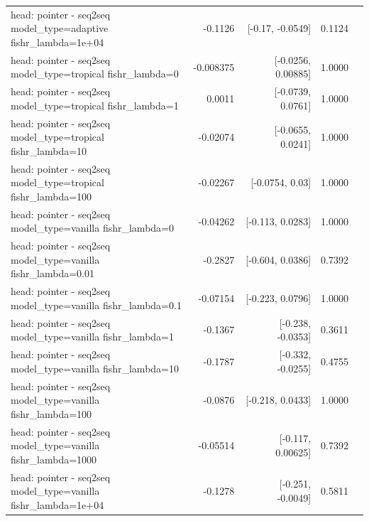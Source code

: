 \documentclass[10pt]{article}
\makeatletter
\newcommand{\stackcell}[1]{\begin{tabular}[t]{@{}l@{}}#1\end{tabular}}
\makeatother
\begin{document}
{\begin{longtable}{lrrrl}
\stackcell{head: pointer - seq2seq\\\footnotesize model\_type=adaptive fishr\_lambda=1e+04 } & -0.1126 & [-0.17, -0.0549] & 0.1124 & \\
\stackcell{head: pointer - seq2seq\\\footnotesize model\_type=tropical fishr\_lambda=0 } & -0.008375 & [-0.0256, 0.00885] & 1.0000 & \\
\stackcell{head: pointer - seq2seq\\\footnotesize model\_type=tropical fishr\_lambda=1 } & 0.0011 & [-0.0739, 0.0761] & 1.0000 & \\
\stackcell{head: pointer - seq2seq\\\footnotesize model\_type=tropical fishr\_lambda=10 } & -0.02074 & [-0.0655, 0.0241] & 1.0000 & \\
\stackcell{head: pointer - seq2seq\\\footnotesize model\_type=tropical fishr\_lambda=100 } & -0.02267 & [-0.0754, 0.03] & 1.0000 & \\
\stackcell{head: pointer - seq2seq\\\footnotesize model\_type=vanilla fishr\_lambda=0 } & -0.04262 & [-0.113, 0.0283] & 1.0000 & \\
\stackcell{head: pointer - seq2seq\\\footnotesize model\_type=vanilla fishr\_lambda=0.01 } & -0.2827 & [-0.604, 0.0386] & 0.7392 & \\
\stackcell{head: pointer - seq2seq\\\footnotesize model\_type=vanilla fishr\_lambda=0.1 } & -0.07154 & [-0.223, 0.0796] & 1.0000 & \\
\stackcell{head: pointer - seq2seq\\\footnotesize model\_type=vanilla fishr\_lambda=1 } & -0.1367 & [-0.238, -0.0353] & 0.3611 & \\
\stackcell{head: pointer - seq2seq\\\footnotesize model\_type=vanilla fishr\_lambda=10 } & -0.1787 & [-0.332, -0.0255] & 0.4755 & \\
\stackcell{head: pointer - seq2seq\\\footnotesize model\_type=vanilla fishr\_lambda=100 } & -0.0876 & [-0.218, 0.0433] & 1.0000 & \\
\stackcell{head: pointer - seq2seq\\\footnotesize model\_type=vanilla fishr\_lambda=1000 } & -0.05514 & [-0.117, 0.00625] & 0.7392 & \\
\stackcell{head: pointer - seq2seq\\\footnotesize model\_type=vanilla fishr\_lambda=1e+04 } & -0.1278 & [-0.251, -0.0049] & 0.5811 & \\
\bottomrule
\end{longtable}
}
\end{document}
